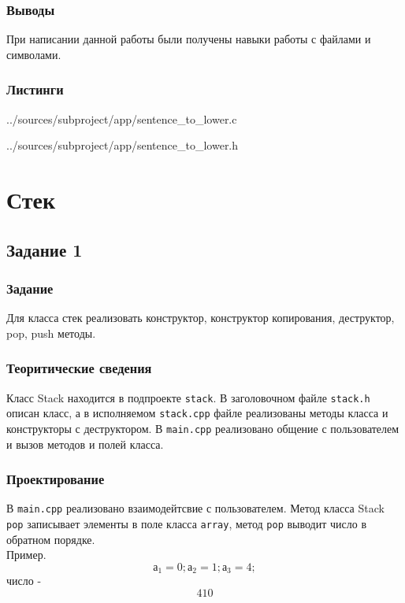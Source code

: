 \documentclass[12pt,a4paper]{report}
\begin{document}
\subsection{Выводы}
При написании данной работы были получены навыки работы с файлами и символами.
\subsection*{Листинги}


{../sources/subproject/app/sentence_to_lower.c}


{../sources/subproject/app/sentence_to_lower.h}
\chapter{Стек}
\section{Задание 1}
\subsection{Задание}
Для класса стек реализовать конструктор, конструктор копирования, деструктор, pop, push методы.
\subsection{Теоритические сведения}
Класс Stack находится в подпроекте \verb+stack+. В заголовочном файле \verb+stack.h+ описан класс, а в исполняемом \verb+stack.cpp+ файле реализованы методы класса и конструкторы с деструктором. В \verb+main.cpp+ реализовано общение с пользователем и вызов методов и полей класса.

\subsection{Проектирование}

В \verb+main.cpp+  реализовано взаимодейтсвие с пользователем. Метод класса Stack \verb+pop+ записывает элементы в поле класса \verb+array+, метод \verb+pop+ выводит число в обратном порядке.\\
Пример. \begin{equation}
а_1=0; а_2=1; а_3=4;
\end{equation} 
число - \begin{equation}410 \end{equation} 
\end{document}

